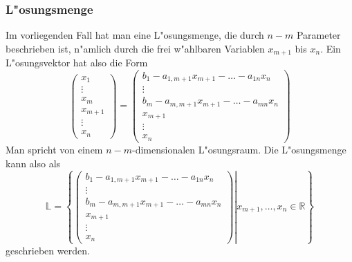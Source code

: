 \subsubsection{L"osungsmenge}
Im vorliegenden Fall hat man eine L"osungsmenge, die durch $n-m$
Parameter beschrieben ist, n"amlich durch die frei w"ahlbaren
Variablen $x_{m+1}$ bis $x_n$. Ein L"osungsvektor hat also die
Form 
\[
\begin{pmatrix}
x_1\\\vdots\\x_m\\x_{m+1}\\\vdots\\x_n
\end{pmatrix}
=
\begin{pmatrix}
b_1-a_{1,m+1}x_{m+1}-\dots-a_{1n}x_n\\
\vdots\\
b_m-a_{m,m+1}x_{m+1}-\dots-a_{mn}x_n\\
x_{m+1}\\
\vdots\\
x_n
\end{pmatrix}
\]
Man spricht von einem $n-m$-dimensionalen L"osungsraum. Die
L"osungsmenge kann also als
$$
\mathbb L
=
\left\{
\left.
\begin{pmatrix}
b_1-a_{1,m+1}x_{m+1}-\dots-a_{1n}x_n\\
\vdots\\
b_m-a_{m,m+1}x_{m+1}-\dots-a_{mn}x_n\\
x_{m+1}\\
\vdots\\
x_n
\end{pmatrix}
\right|
x_{m+1},\dots,x_n\in\mathbb R
\right\}
$$
geschrieben werden.
